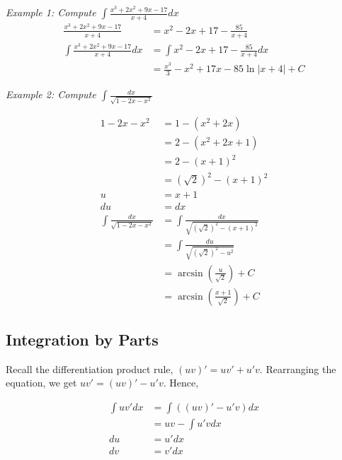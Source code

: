         \noindent \color{blue} \textit{Example 1: Compute $\int\frac{x^3+2x^2+9x-17}{x+4}dx$} \color{black} \\

        \begin{align*}
            \frac{x^3+2x^2+9x-17}{x+4}          &= x^2-2x+17-\frac{85}{x+4} \\
            \int\frac{x^3+2x^2+9x-17}{x+4}dx    &= \int x^2-2x+17-\frac{85}{x+4}dx \\
            &= \frac{x^3}{3}-x^2+17x-85\ln{|x+4|}+C
        \end{align*}

        \noindent \color{blue} \textit{Example 2: Compute $\int\frac{dx}{\sqrt{1-2x-x^2}}$} \color{black}

        \begin{align*}
            1-2x-x^2                        &= 1-(x^2+2x) \\
            &= 2-(x^2+2x+1) \\
            &= 2-(x+1)^2 \\
            &= (\sqrt{2})^2-(x+1)^2 \\
            u                               &= x+1 \\
            du                              &= dx \\
            \int\frac{dx}{\sqrt{1-2x-x^2}}  &= \int\frac{dx}{\sqrt{(\sqrt{2})^2-(x+1)^2}} \\
            &= \int\frac{du}{\sqrt{(\sqrt{2})^2-u^2}} \\
            &= \arcsin{\left(\frac{u}{\sqrt{2}}\right)}+C \\
            &= \arcsin{\left(\frac{x+1}{\sqrt{2}}\right)}+C
        \end{align*}



    \subsection{Integration by Parts}
        Recall the differentiation product rule, $(uv)'=uv'+u'v$. Rearranging the equation, we
        get $uv'=(uv)'-u'v$. Hence,

        \begin{align*}
            \int uv'dx  &= \int ((uv)'-u'v)dx \\
            &= uv - \int u'vdx \\
            du          &= u'dx \\
            dv          &= v'dx
        \end{align*}


